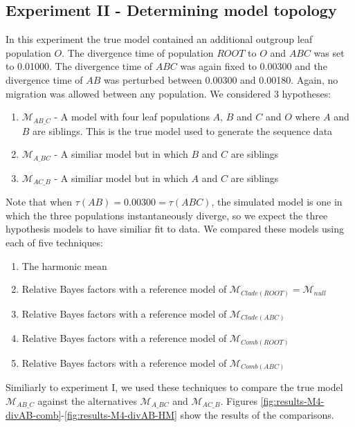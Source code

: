\documentclass[11pt]{article}
\newcommand{\M}{\mathcal{M}}
\newcommand{\1}{\mathbbm{1}}
\begin{document}
\subsection{Experiment II - Determining model topology}
In this experiment the true model contained an additional outgroup leaf population $O$. The divergence time of population $ROOT$ to $O$ and $ABC$ was set to 0.01000. The divergence time of $ABC$ was again fixed to 0.00300 and the divergence time of $AB$ was perturbed between 0.00300 and 0.00180. Again, no migration was allowed between any population. We considered 3 hypotheses:
%
\begin{enumerate}
\item $\M_{AB\_C}$ - A model with four leaf populations $A$, $B$ and $C$ and $O$ where $A$ and $B$ are siblings. This is the true model used to generate the sequence data
\item $\M_{A\_BC}$ - A similiar model but in which $B$ and $C$ are siblings
\item $\M_{AC\_B}$ - A similiar model but in which $A$ and $C$ are siblings
\end{enumerate}
%
Note that when $\tau(AB) = 0.00300 = \tau(ABC)$, the simulated model is one in which  the three populations instantaneously diverge, so we expect the three hypothesis models to have similiar fit to data. We compared these models using each of five techniques:
%
\begin{enumerate}
\item The harmonic mean
\item Relative Bayes factors with a reference model of $\M_{Clade(ROOT)} = \M_{null}$
\item Relative Bayes factors with a reference model of $\M_{Clade(ABC)}$
\item Relative Bayes factors with a reference model of $\M_{Comb(ROOT)}$
\item Relative Bayes factors with a reference model of $\M_{Comb(ABC)}$
\end{enumerate}


Similiarly to experiment I, we used these techniques to compare the true model $\M_{AB\_C}$ against the alternatives $\M_{A\_BC}$ and $\M_{AC\_B}$. Figures \ref{fig:results-M4-divAB-comb}-\ref{fig:results-M4-divAB-HM} show the results of the comparisons.
\end{document}
